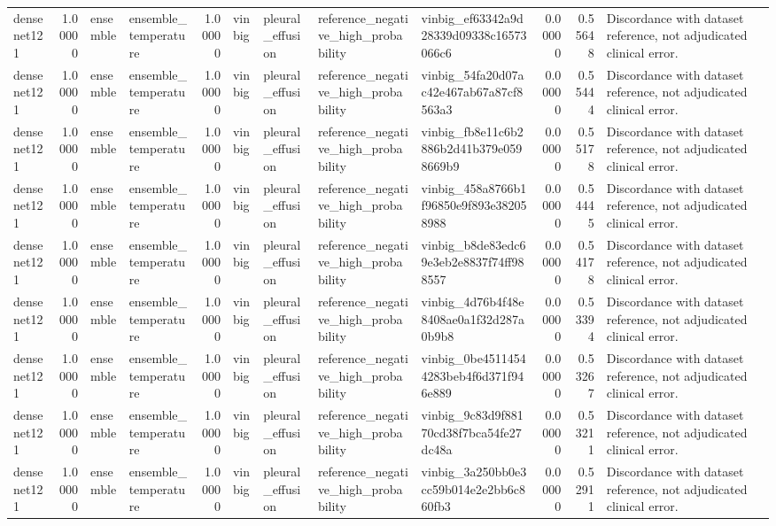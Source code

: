 \begin{tabular}{lrllrllllrrl}
densenet121 & 1.00000 & ensemble & ensemble\_temperature & 1.00000 & vinbig & pleural\_effusion & reference\_negative\_high\_probability & vinbig\_ef63342a9d28339d09338c16573066c6 & 0.00000 & 0.55648 & Discordance with dataset reference, not adjudicated clinical error. \\
densenet121 & 1.00000 & ensemble & ensemble\_temperature & 1.00000 & vinbig & pleural\_effusion & reference\_negative\_high\_probability & vinbig\_54fa20d07ac42e467ab67a87cf8563a3 & 0.00000 & 0.55444 & Discordance with dataset reference, not adjudicated clinical error. \\
densenet121 & 1.00000 & ensemble & ensemble\_temperature & 1.00000 & vinbig & pleural\_effusion & reference\_negative\_high\_probability & vinbig\_fb8e11c6b2886b2d41b379e0598669b9 & 0.00000 & 0.55178 & Discordance with dataset reference, not adjudicated clinical error. \\
densenet121 & 1.00000 & ensemble & ensemble\_temperature & 1.00000 & vinbig & pleural\_effusion & reference\_negative\_high\_probability & vinbig\_458a8766b1f96850e9f893e382058988 & 0.00000 & 0.54445 & Discordance with dataset reference, not adjudicated clinical error. \\
densenet121 & 1.00000 & ensemble & ensemble\_temperature & 1.00000 & vinbig & pleural\_effusion & reference\_negative\_high\_probability & vinbig\_b8de83edc69e3eb2e8837f74ff988557 & 0.00000 & 0.54178 & Discordance with dataset reference, not adjudicated clinical error. \\
densenet121 & 1.00000 & ensemble & ensemble\_temperature & 1.00000 & vinbig & pleural\_effusion & reference\_negative\_high\_probability & vinbig\_4d76b4f48e8408ae0a1f32d287a0b9b8 & 0.00000 & 0.53394 & Discordance with dataset reference, not adjudicated clinical error. \\
densenet121 & 1.00000 & ensemble & ensemble\_temperature & 1.00000 & vinbig & pleural\_effusion & reference\_negative\_high\_probability & vinbig\_0be45114544283beb4f6d371f946e889 & 0.00000 & 0.53267 & Discordance with dataset reference, not adjudicated clinical error. \\
densenet121 & 1.00000 & ensemble & ensemble\_temperature & 1.00000 & vinbig & pleural\_effusion & reference\_negative\_high\_probability & vinbig\_9c83d9f88170cd38f7bca54fe27dc48a & 0.00000 & 0.53211 & Discordance with dataset reference, not adjudicated clinical error. \\
densenet121 & 1.00000 & ensemble & ensemble\_temperature & 1.00000 & vinbig & pleural\_effusion & reference\_negative\_high\_probability & vinbig\_3a250bb0e3cc59b014e2e2bb6c860fb3 & 0.00000 & 0.52911 & Discordance with dataset reference, not adjudicated clinical error. \\

\end{tabular}
